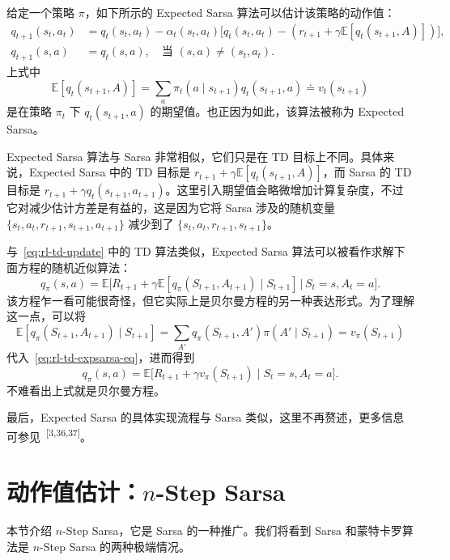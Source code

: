 \begin{derivation}
\label{box:rl-td-expsarsa}
给定一个策略 $\pi$，如下所示的 Expected Sarsa 算法可以估计该策略的动作值：
\begin{align*}
  q_{t+1}(s_t, a_t) &= q_t(s_t, a_t) - \alpha_t(s_t, a_t) \Big[ q_t(s_t, a_t) - (r_{t+1} + \gamma \mathbb{E}[q_t(s_{t+1}, A)]) \Big], \\
  q_{t+1}(s, a) &= q_t(s, a), \quad \text{当 } (s, a) \neq (s_t, a_t).
\end{align*}
上式中
\[
  \mathbb{E}[q_t(s_{t+1}, A)] = \sum_a \pi_t(a \mid s_{t+1}) q_t(s_{t+1}, a) \doteq v_t(s_{t+1})
\]
是在策略 $\pi_t$ 下 $q_t(s_{t+1}, a)$ 的期望值。也正因为如此，该算法被称为 Expected Sarsa。

Expected Sarsa 算法与 Sarsa 非常相似，它们只是在 TD 目标上不同。具体来说，Expected Sarsa 中的 TD 目标是 $r_{t+1} + \gamma \mathbb{E}[q_t(s_{t+1}, A)]$，而 Sarsa 的 TD 目标是 $r_{t+1} + \gamma q_t(s_{t+1}, a_{t+1})$。这里引入期望值会略微增加计算复杂度，不过它对减少估计方差是有益的，这是因为它将 Sarsa 涉及的随机变量 $\{s_t, a_t, r_{t+1}, s_{t+1}, a_{t+1}\}$ 减少到了 $\{s_t, a_t, r_{t+1}, s_{t+1}\}$。

与~\eqref{eq:rl-td-update} 中的 TD 算法类似，Expected Sarsa 算法可以被看作求解下面方程的随机近似算法：
\begin{equation}
  q_{\pi}(s, a) = \mathbb{E}\Big[ R_{t+1} + \gamma \mathbb{E}[q_{\pi}(S_{t+1}, A_{t+1}) \mid S_{t+1}] \,\Big|\, S_t = s, A_t = a \Big].
  \label{eq:rl-td-expsarsa-eq}
\end{equation}
该方程乍一看可能很奇怪，但它实际上是贝尔曼方程的另一种表达形式。为了理解这一点，可以将
\[
  \mathbb{E}[q_{\pi}(S_{t+1}, A_{t+1}) \mid S_{t+1}] = \sum_{A'} q_{\pi}(S_{t+1}, A') \pi(A' \mid S_{t+1}) = v_{\pi}(S_{t+1})
\]
代入~\eqref{eq:rl-td-expsarsa-eq}，进而得到
\[
  q_{\pi}(s, a) = \mathbb{E}\Big[ R_{t+1} + \gamma v_{\pi}(S_{t+1}) \mid S_t = s, A_t = a \Big].
\]
不难看出上式就是贝尔曼方程。

最后，Expected Sarsa 的具体实现流程与 Sarsa 类似，这里不再赘述，更多信息可参见~\textsuperscript{[3,36,37]}。
\end{derivation}

\section{动作值估计：$n$-Step Sarsa}
\label{sec:rl-td-nstep}

本节介绍 $n$-Step Sarsa，它是 Sarsa 的一种推广。我们将看到 Sarsa 和蒙特卡罗算法是 $n$-Step Sarsa 的两种极端情况。

